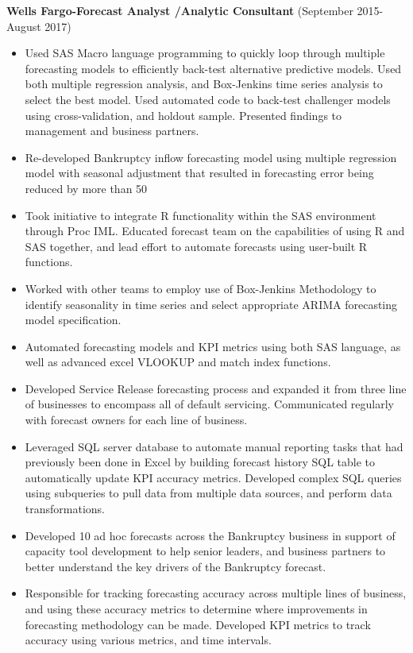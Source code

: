 \documentclass[a4paper,10pt]{article}
\begin{document}
\noindent
\textbf{Wells Fargo-Forecast Analyst /Analytic Consultant} (September 2015-August 2017) 
\begin{itemize}
\item Used SAS Macro language programming to quickly loop through multiple forecasting models to efficiently back-test alternative predictive models. Used both multiple regression analysis, and Box-Jenkins time series analysis to select the best model.  Used automated code to back-test challenger models using cross-validation, and holdout sample.  Presented findings to management and business partners.
\item Re-developed Bankruptcy inflow forecasting model using multiple regression model with seasonal adjustment that resulted in forecasting error being reduced by more than 50%
\item Took initiative to integrate R functionality within the SAS environment through Proc IML.  Educated forecast team on the capabilities of using R and SAS together, and lead effort to automate forecasts using user-built R functions.
\item Worked with other teams to employ use of Box-Jenkins Methodology to identify seasonality in time series and select appropriate ARIMA forecasting model specification.
\item Automated forecasting models and KPI metrics using both SAS language, as well as advanced excel VLOOKUP and match index functions.
\item Developed Service Release forecasting process and expanded it from three line of businesses to encompass all of default servicing.  Communicated regularly with forecast owners for each line of business.
\item Leveraged SQL server database to automate manual reporting tasks that had previously been done in Excel by building forecast history SQL table to automatically update KPI accuracy metrics. Developed complex SQL queries using subqueries to pull data from multiple data sources, and perform data transformations.
\item Developed 10 ad hoc forecasts across the Bankruptcy business in support of capacity tool development to help senior leaders, and business partners to better understand the key drivers of the Bankruptcy forecast.
\item Responsible for tracking forecasting accuracy across multiple lines of business, and using these accuracy metrics to determine where improvements in forecasting methodology can be made. Developed KPI metrics to track accuracy using various metrics, and time intervals. 
\end{itemize}
\end{document}
